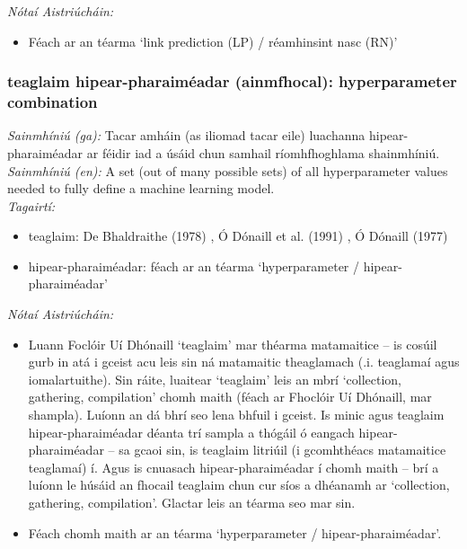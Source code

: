 \documentclass{article}
\begin{document}
 \noindent \textit{Nótaí Aistriúcháin:}
\begin{itemize}
	\item Féach ar an téarma `link prediction (LP) / réamhinsint nasc (RN)'
\end{itemize}


\subsubsection*{teaglaim hipear-pharaiméadar (ainmfhocal): hyperparameter combination}
 \noindent \textit{Sainmhíniú (ga):} Tacar amháin (as iliomad tacar eile) luachanna hipear-pharaiméadar ar féidir iad a úsáid chun samhail ríomhfhoghlama shainmhíniú.
\\
 \noindent \textit{Sainmhíniú (en):} A set (out of many possible sets) of all hyperparameter values needed to fully define a machine learning model.
\\
 \noindent \textit{Tagairtí:}
\begin{itemize}
	\item teaglaim: De Bhaldraithe (1978) \cite{de-bhaldraithe}, Ó Dónaill et al. (1991) \cite{focloir-beag}, Ó Dónaill (1977) \cite{odonaill}
	\item hipear-pharaiméadar: féach ar an téarma `hyperparameter / hipear-pharaiméadar'
\end{itemize}

 \noindent \textit{Nótaí Aistriúcháin:}
\begin{itemize}
	\item Luann Foclóir Uí Dhónaill `teaglaim' mar théarma matamaitice -- is cosúil gurb in atá i gceist acu leis sin ná matamaitic theaglamach (.i. teaglamaí agus iomalartuithe). Sin ráite, luaitear `teaglaim' leis an mbrí `collection, gathering, compilation' chomh maith (féach ar Fhoclóir Uí Dhónaill, mar shampla). Luíonn an dá bhrí seo lena bhfuil i gceist. Is minic agus teaglaim hipear-pharaiméadar déanta trí sampla a thógáil ó eangach hipear-pharaiméadar -- sa gcaoi sin, is teaglaim litriúil (i gcomhthéacs matamaitice teaglamaí) í. Agus is cnuasach hipear-pharaiméadar í chomh maith -- brí a luíonn le húsáid an fhocail teaglaim chun cur síos a dhéanamh ar `collection, gathering, compilation'. Glactar leis an téarma seo mar sin.
	\item Féach chomh maith ar an téarma `hyperparameter / hipear-pharaiméadar'.
\end{itemize}
\end{document}

